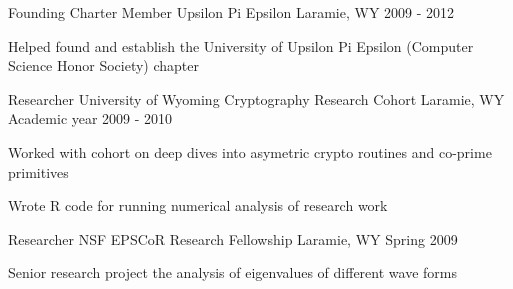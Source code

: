 \begin{cventries}
\cventry
{Founding Charter Member} %
{Upsilon Pi Epsilon} %
{Laramie, WY} %
{2009 - 2012} %
{ %
\begin{cvitems}
\item {Helped found and establish the University of Upsilon Pi Epsilon (Computer Science Honor Society) chapter}
\end{cvitems}
}


\cventry
{Researcher} %
{University of Wyoming Cryptography Research Cohort} %
{Laramie, WY} %
{Academic year 2009 - 2010} %
{ %
\begin{cvitems}
\item {Worked with cohort on deep dives into asymetric crypto routines and co-prime primitives}
\item {Wrote R code for running numerical analysis of research work}
\end{cvitems}
}


\cventry
{Researcher} %
{NSF EPSCoR Research Fellowship} %
{Laramie, WY} %
{Spring 2009} %
{ %
\begin{cvitems}
\item {Senior research project the analysis of eigenvalues of different wave forms}
\end{cvitems}
}


\end{cventries}